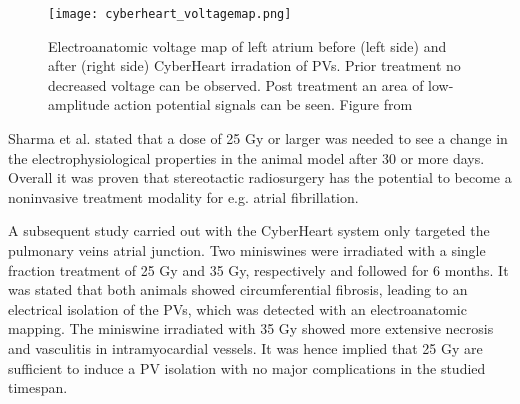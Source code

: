\documentclass[type=dr, dr=rernat, accentcolor=tud7b,colorbacktitle, bigchapter, openright, twoside, 12pt ]{tudthesis}
\begin{document}

\begin{figure}[H]
\begin{center}
\texttt{[image: cyberheart\_voltagemap.png]}
\caption{Electroanatomic voltage map of left atrium before (left side) and after (right side) CyberHeart irradation of PVs. Prior treatment 
no decreased voltage can be observed. Post treatment an area of low-amplitude action potential signals can be seen. Figure from \cite{Sha10}}
\label{LA_map}
\end{center}
\end{figure}

Sharma et al. stated that a dose of 25 Gy or larger was needed to see a change in the electrophysiological properties in the animal model 
after 30 or more days. Overall it was proven that stereotactic radiosurgery has the potential to 
become a noninvasive treatment modality for e.g. atrial fibrillation. \newline

A subsequent study carried out with the CyberHeart system \cite{Mag11} only targeted the pulmonary veins atrial junction. Two miniswines 
were irradiated with a single fraction treatment of 25 Gy and 35 Gy, respectively and followed for 6 months. It was stated that both animals 
showed circumferential fibrosis, leading to an electrical isolation of the PVs, which was detected with an electroanatomic mapping. 
The miniswine irradiated with 35 Gy showed more extensive necrosis and vasculitis in intramyocardial vessels. It was hence implied that 
25 Gy are sufficient to induce a PV isolation with no major complications in the studied timespan. \newline
\end{document}
